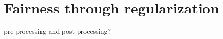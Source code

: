 \chapter{Fairness through regularization}
\label{fairness_inproc}

pre-processing and post-processing?

